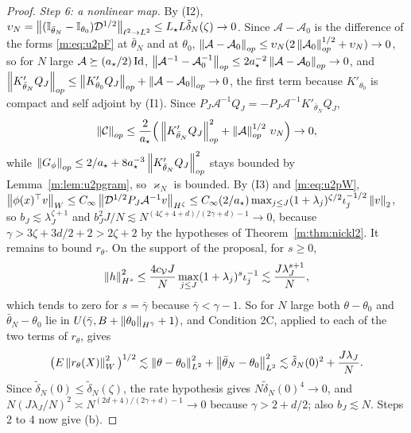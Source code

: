 \begin{proof}
\emph{Step 6: a nonlinear map.} By (I2), $\upsilon_N=\left\|(\mathbb{I}_{\bar\theta_N}-\mathbb{I}_{\theta_0})\mathcal D^{1/2}\right\|_{\ell^2\to L^2}\le L_\star L\tilde\delta_N(\zeta)\to0$. Since $\mathcal A-\mathcal A_0$ is the difference of the forms \eqref{m:eq:u2pF} at $\bar\theta_N$ and at $\theta_0$, $\left\|\mathcal A-\mathcal A_0\right\|_{op}\le\upsilon_N(2\left\|\mathcal A_0\right\|^{1/2}_{op}+\upsilon_N)\to0$, so for $N$ large $\mathcal A\succeq(a_\star/2)\operatorname{Id}$, $\left\|\mathcal A^{-1}-\mathcal A_0^{-1}\right\|_{op}\le2a_\star^{-2}\left\|\mathcal A-\mathcal A_0\right\|_{op}\to0$, and $\left\|K'_{\bar\theta_N}Q_J\right\|_{op}\le\left\|K'_{\theta_0}Q_J\right\|_{op}+\left\|\mathcal A-\mathcal A_0\right\|_{op}\to0$, the first term because $K'_{\theta_0}$ is compact and self adjoint by (I1). Since $P_J\mathcal A^{-1}Q_J=-P_J\mathcal A^{-1}K'_{\bar\theta_N}Q_J$,
\[
\left\|\mathcal C\right\|_{op}\le\frac2{a_\star}\Big(\left\|K'_{\bar\theta_N}Q_J\right\|^2_{op}+\left\|\mathcal A\right\|^{1/2}_{op}\,\upsilon_N\Big)\to0 ,
\]
while $\left\|G_\phi\right\|_{op}\le2/a_\star+8a_\star^{-3}\left\|K'_{\bar\theta_N}Q_J\right\|^2_{op}$ stays bounded by Lemma~\ref{m:lem:u2pgram}, so $\varkappa_N$ is bounded. By (I3) and \eqref{m:eq:u2pW}, $\left\|\phi(x)^\top v\right\|_W\le C_\infty\left\|\mathcal D^{1/2}P_J\mathcal A^{-1}v\right\|_{H^\zeta}\le C_\infty(2/a_\star)\max_{j\le J}(1+\lambda_j)^{\zeta/2}\iota_j^{-1/2}\left\|v\right\|_2$, so $b_J\lesssim\lambda_J^{\zeta+1}$ and $b_J^2J/N\lesssim N^{(4\zeta+4+d)/(2\gamma+d)-1}\to0$, because $\gamma>3\zeta+3d/2+2>2\zeta+2$ by the hypotheses of Theorem~\ref{m:thm:nickl2}. It remains to bound $r_\theta$. On the support of the proposal, for $s\ge0$,
\[
\left\|h\right\|^2_{H^s}\le\frac{4c_{\mathcal V}J}N\max_{j\le J}(1+\lambda_j)^s\iota_j^{-1}\lesssim\frac{J\lambda_J^{s+1}}N ,
\]
which tends to zero for $s=\bar\gamma$ because $\bar\gamma<\gamma-1$. So for $N$ large both $\theta-\theta_0$ and $\bar\theta_N-\theta_0$ lie in $U(\bar\gamma,B+\left\|\theta_0\right\|_{H^{\bar\gamma}}+1)$, and Condition 2C, applied to each of the two terms of $r_\theta$, gives
\[
\big(E\left\|r_\theta(X)\right\|^2_W\big)^{1/2}\lesssim\left\|\theta-\theta_0\right\|^2_{L^2}+\left\|\bar\theta_N-\theta_0\right\|^2_{L^2}\lesssim\tilde\delta_N(0)^2+\frac{J\lambda_J}N .
\]
Since $\tilde\delta_N(0)\le\tilde\delta_N(\zeta)$, the rate hypothesis gives $N\tilde\delta_N(0)^4\to0$, and $N(J\lambda_J/N)^2\asymp N^{(2d+4)/(2\gamma+d)-1}\to0$ because $\gamma>2+d/2$; also $b_J\lesssim N$. Steps 2 to 4 now give (b).


\end{proof}
